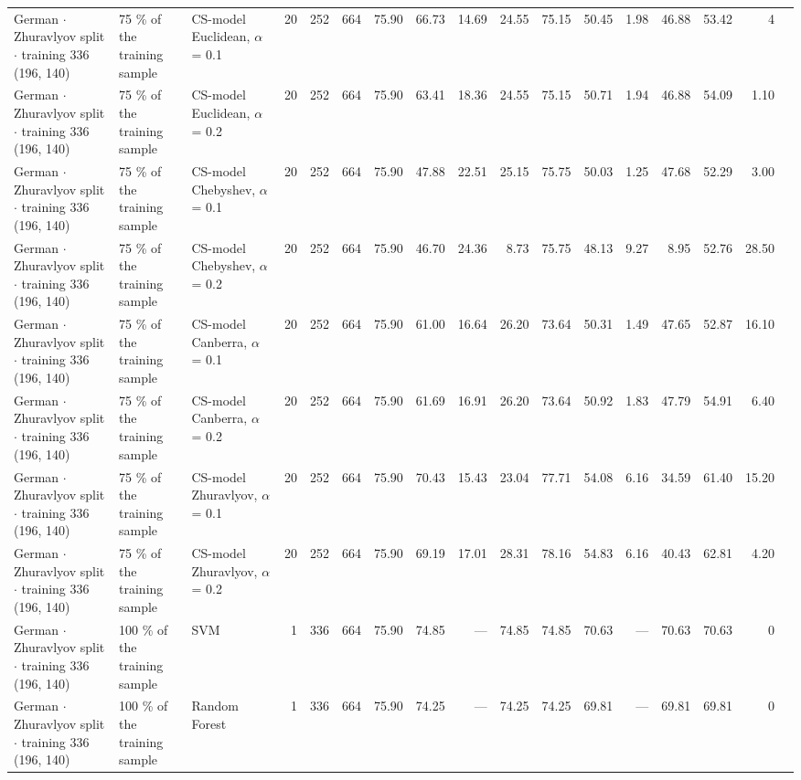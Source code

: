 \begin{longtable}{lllrrrrrrrrrrrrrl}
  German $\cdot$ Zhuravlyov split $\cdot$ training 336 (196, 140) & 75 \% of the training sample & CS-model Euclidean, $\alpha$ = 0.1 & 20 & 252 & 664 & 75.90 & 66.73 & 14.69 & 24.55 & 75.15 & 50.45 & 1.98 & 46.88 & 53.42 & 4 &  \\
  German $\cdot$ Zhuravlyov split $\cdot$ training 336 (196, 140) & 75 \% of the training sample & CS-model Euclidean, $\alpha$ = 0.2 & 20 & 252 & 664 & 75.90 & 63.41 & 18.36 & 24.55 & 75.15 & 50.71 & 1.94 & 46.88 & 54.09 & 1.10 &  \\
  German $\cdot$ Zhuravlyov split $\cdot$ training 336 (196, 140) & 75 \% of the training sample & CS-model Chebyshev, $\alpha$ = 0.1 & 20 & 252 & 664 & 75.90 & 47.88 & 22.51 & 25.15 & 75.75 & 50.03 & 1.25 & 47.68 & 52.29 & 3.00 &  \\
  German $\cdot$ Zhuravlyov split $\cdot$ training 336 (196, 140) & 75 \% of the training sample & CS-model Chebyshev, $\alpha$ = 0.2 & 20 & 252 & 664 & 75.90 & 46.70 & 24.36 & 8.73 & 75.75 & 48.13 & 9.27 & 8.95 & 52.76 & 28.50 &  \\
  German $\cdot$ Zhuravlyov split $\cdot$ training 336 (196, 140) & 75 \% of the training sample & CS-model Canberra, $\alpha$ = 0.1 & 20 & 252 & 664 & 75.90 & 61.00 & 16.64 & 26.20 & 73.64 & 50.31 & 1.49 & 47.65 & 52.87 & 16.10 &  \\
  German $\cdot$ Zhuravlyov split $\cdot$ training 336 (196, 140) & 75 \% of the training sample & CS-model Canberra, $\alpha$ = 0.2 & 20 & 252 & 664 & 75.90 & 61.69 & 16.91 & 26.20 & 73.64 & 50.92 & 1.83 & 47.79 & 54.91 & 6.40 &  \\
  German $\cdot$ Zhuravlyov split $\cdot$ training 336 (196, 140) & 75 \% of the training sample & CS-model Zhuravlyov, $\alpha$ = 0.1 & 20 & 252 & 664 & 75.90 & 70.43 & 15.43 & 23.04 & 77.71 & 54.08 & 6.16 & 34.59 & 61.40 & 15.20 &  \\
  German $\cdot$ Zhuravlyov split $\cdot$ training 336 (196, 140) & 75 \% of the training sample & CS-model Zhuravlyov, $\alpha$ = 0.2 & 20 & 252 & 664 & 75.90 & 69.19 & 17.01 & 28.31 & 78.16 & 54.83 & 6.16 & 40.43 & 62.81 & 4.20 &  \\
  German $\cdot$ Zhuravlyov split $\cdot$ training 336 (196, 140) & 100 \% of the training sample & SVM & 1 & 336 & 664 & 75.90 & 74.85 & --- & 74.85 & 74.85 & 70.63 & --- & 70.63 & 70.63 & 0 &  \\
  German $\cdot$ Zhuravlyov split $\cdot$ training 336 (196, 140) & 100 \% of the training sample & Random Forest & 1 & 336 & 664 & 75.90 & 74.25 & --- & 74.25 & 74.25 & 69.81 & --- & 69.81 & 69.81 & 0 &  \\

\end{longtable}
